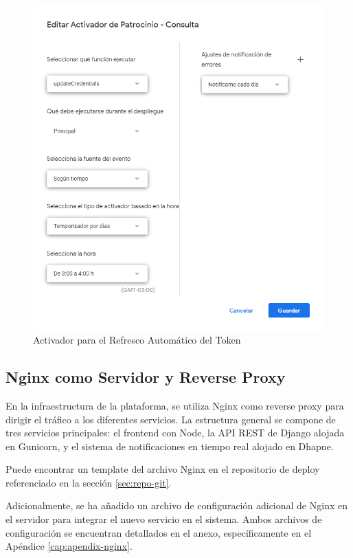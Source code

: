 \begin{figure}[H]
    \centering
    \includegraphics[width=1\linewidth]{fig/activador-credentials-form.png}
    \caption{Activador para el Refresco Automático del Token}
    \label{fig:activador-credentials-form}
\end{figure}



\subsection{Nginx como Servidor y Reverse Proxy}
En la infraestructura de la plataforma, se utiliza Nginx como reverse proxy para dirigir el tráfico a los diferentes servicios. La estructura general se compone de tres servicios principales: el frontend con Node, la API REST de Django alojada en Gunicorn, y el sistema de notificaciones en tiempo real alojado en Dhapne.

Puede encontrar un template del archivo Nginx en el repositorio de deploy referenciado en la sección \ref{sec:repo-git}.

Adicionalmente, se ha añadido un archivo de configuración adicional de Nginx en el servidor para integrar el nuevo servicio en el sistema. Ambos archivos de configuración se encuentran detallados en el anexo, específicamente en el Apéndice \ref{cap:apendix-nginx}.

